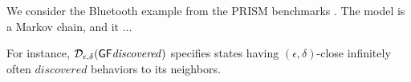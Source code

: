 We consider the Bluetooth example from the PRISM benchmarks \cite{prism-bluetooth-page}. The model is a 
Markov chain, and it ...

For instance,
$\mathcal{D}_{{\epsilon}, {\delta}} (\mathsf{G}   \mathsf{F} \mathit{discovered})$ 
specifies states having $(\epsilon, \delta)$-close
infinitely often $\mathit{discovered}$ behaviors to its neighbors.

